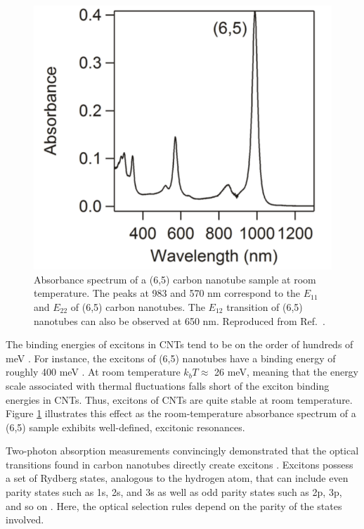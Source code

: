 \begin{figure}[ht]
	\centering
	\includegraphics[scale=0.62]{images/chapter_optical_props/cnt_absorbance_yota}
	\caption{Absorbance spectrum of a (6,5) carbon nanotube sample at room temperature. The peaks at 983 and 570 nm correspond to the $E_{11}$ and $E_{22}$ of (6,5) carbon nanotubes. The $E_{12}$ transition of (6,5) nanotubes can also be observed at 650 nm. Reproduced from Ref.\ \cite{ichinose2017extraction}. }
	\label{fig:cnt_abs_yota}
\end{figure}

The binding energies of excitons in CNTs tend to be on the order of hundreds of meV \cite{wang2005optical}. For instance, the excitons of (6,5) nanotubes have a binding energy of roughly 400 meV \cite{wang2005optical}. At room temperature $k_b T \approx$ 26 meV, meaning that the energy scale associated with thermal fluctuations falls short of the exciton binding energies in CNTs. Thus, excitons of CNTs are quite stable at room temperature. Figure \ref{fig:cnt_abs_yota} illustrates this effect as the room-temperature absorbance spectrum of a (6,5) sample exhibits well-defined, excitonic resonances.

Two-photon absorption measurements convincingly demonstrated that the optical transitions found in carbon nanotubes directly create excitons \cite{wang2005optical, maultzsch2005exciton}. Excitons possess a set of Rydberg states, analogous to the hydrogen atom, that can include even parity states such as 1s, 2s, and 3s as well as odd parity states such as 2p, 3p, and so on \cite{wang2005optical}. Here, the optical selection rules depend on the parity of the states involved.


